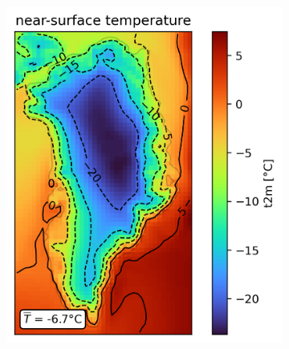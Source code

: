 \begin{figure}
	\centering
	\begin{subfigure}{0.46\textwidth}
		\centering
		\includegraphics[width=\textwidth]{../global-warming/figs/21c-t2m-mean.png}
	\end{subfigure}
	\begin{subfigure}{0.44\textwidth}
		\centering

\end{subfigure}
\end{figure}
